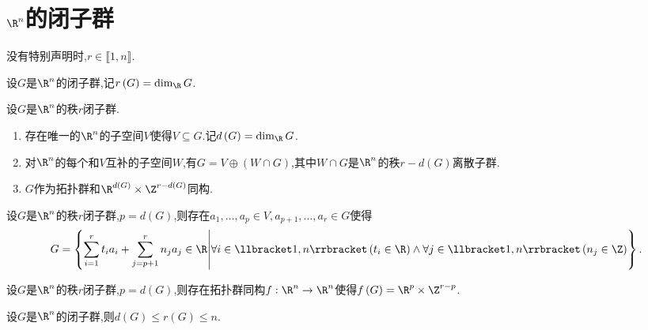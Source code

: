 \section{\texorpdfstring{$\R^{n}$}{Rn}的闭子群}

没有特别声明时,$r\in\llbracket 1,n\rrbracket$.

\begin{definition}{}{}
	设$G$是$\R^{n}$的闭子群,记$r\left(G\right)=\dim_{\R}G$.
\end{definition}

\begin{theorem}{}{}
	设$G$是$\R^{n}$的秩$r$闭子群.
	\begin{enumerate}
		\item 存在唯一的$\R^{n}$的子空间$V$使得$V\subseteq G$.记$d\left(G\right)=\dim_{\R}G$.
		\item 对$\R^{n}$的每个和$V$互补的子空间$W$,有$G=V\oplus\left(W\cap G\right)$,其中$W\cap G$是$\R^{n}$的秩$r-d\left(G\right)$离散子群.
		\item $G$作为拓扑群和$\R^{d\left(G\right)}\times\Z^{r-d\left(G\right)}$同构.
	\end{enumerate}
\end{theorem}

\begin{corollary}{}{}
	设$G$是$\R^{n}$的秩$r$闭子群,$p=d\left(G\right)$,则存在$a_{1},\ldots,a_{p}\in V,a_{p+1},\ldots,a_{r}\in G$使得
	\begin{align*}
		G=\left\{\sum\limits_{i=1}^{r}t_{i}a_{i}+\sum\limits_{j=p+1}^{r}n_{j}a_{j}\in\R\middle|\forall i\in\llbracket 1,n\rrbracket\left(t_{i}\in\R\right)\wedge\forall j\in\llbracket 1,n\rrbracket\left(n_{j}\in\Z\right)\right\}.
	\end{align*}
\end{corollary}

\begin{corollary}{}{}
	设$G$是$\R^{n}$的秩$r$闭子群,$p=d\left(G\right)$,则存在拓扑群同构$f:\R^{n}\to\R^{n}$使得$f\left(G\right)=\R^{p}\times\Z^{r-p}$.
\end{corollary}

\begin{proposition}{}{}
	设$G$是$\R^{n}$的闭子群,则$d\left(G\right)\leqslant r\left(G\right)\leqslant n$.
\end{proposition}
